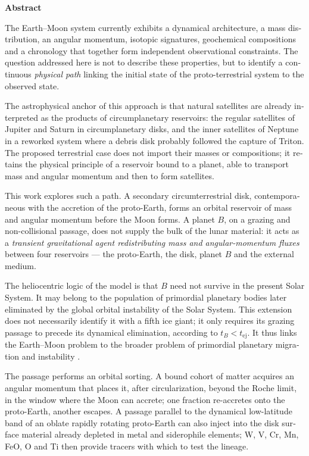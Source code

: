 \documentclass[11pt,a4paper,openany]{report}
\begin{document}
\bigskip
\begin{otherlanguage}{english}
\begin{center}{\Large\bfseries Abstract}\end{center}
\medskip

The Earth--Moon system currently exhibits a dynamical architecture, a mass distribution, an
angular momentum, isotopic signatures, geochemical compositions and a chronology that together
form independent observational constraints. The question addressed here is not to describe these
properties, but to identify a continuous \emph{physical path} linking the initial state of the
proto-terrestrial system to the observed state.

The astrophysical anchor of this approach is that natural satellites are already interpreted as
the products of circumplanetary reservoirs: the regular satellites of Jupiter and Saturn in
circumplanetary disks, and the inner satellites of Neptune in a reworked system where a debris
disk probably followed the capture of Triton. The proposed terrestrial case does not import their
masses or compositions; it retains the physical principle of a reservoir bound to a planet, able
to transport mass and angular momentum and then to form satellites.

This work explores such a path. A secondary circumterrestrial disk, contemporaneous with the
accretion of the proto-Earth, forms an orbital reservoir of mass and angular momentum before the
Moon forms. A planet $B$, on a grazing and non-collisional passage, does not supply the bulk of
the lunar material: it acts as a \emph{transient gravitational agent redistributing
mass and angular-momentum fluxes} between four reservoirs --- the proto-Earth, the disk, planet
$B$ and the external medium.

The heliocentric logic of the model is that $B$ need not survive in the present Solar System. It may
belong to the population of primordial planetary bodies later eliminated by the global orbital
instability of the Solar System. This extension does not necessarily identify it with a fifth ice
giant; it only requires its grazing passage to precede its dynamical elimination, according to
$t_B<t_{\mathrm{ej}}$. It thus links the Earth--Moon problem to the broader problem of primordial
planetary migration and instability
\cite{Tsiganis2005,Gomes2005,Nesvorny2011,NesvornyMorbidelli2012,Liu2022,Clement2018}.

The passage performs an orbital sorting. A bound cohort of matter acquires an angular momentum
that places it, after circularization, beyond the Roche limit, in the window where the Moon can
accrete; one fraction re-accretes onto the proto-Earth, another escapes. A passage parallel to the
dynamical low-latitude band of an oblate rapidly rotating proto-Earth can also inject into the disk
surface material already depleted in metal and siderophile elements; W, V, Cr, Mn, FeO, O and Ti
then provide tracers with which to test the lineage.


\end{otherlanguage}
\end{document}

